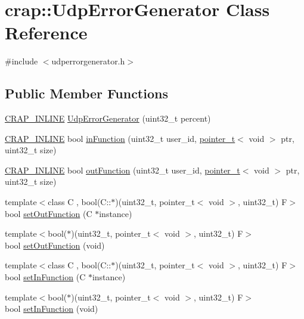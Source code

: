 \hypertarget{classcrap_1_1_udp_error_generator}{}\section{crap\+:\+:Udp\+Error\+Generator Class Reference}
\label{classcrap_1_1_udp_error_generator}


{\ttfamily \#include $<$udperrorgenerator.\+h$>$}

\subsection*{Public Member Functions}
\begin{DoxyCompactItemize}
\item 
\hyperlink{config__x86_8h_a5a40526b8d842e7ff731509998bb0f1c}{C\+R\+A\+P\+\_\+\+I\+N\+L\+I\+N\+E} \hyperlink{classcrap_1_1_udp_error_generator_aa20c6432764f4e0498decd46e19ec6c2}{Udp\+Error\+Generator} (uint32\+\_\+t percent)
\item 
\hyperlink{config__x86_8h_a5a40526b8d842e7ff731509998bb0f1c}{C\+R\+A\+P\+\_\+\+I\+N\+L\+I\+N\+E} bool \hyperlink{classcrap_1_1_udp_error_generator_ab982b08f833d37210739f819ea651188}{in\+Function} (uint32\+\_\+t user\+\_\+id, \hyperlink{structcrap_1_1pointer__t}{pointer\+\_\+t}$<$ void $>$ ptr, uint32\+\_\+t size)
\item 
\hyperlink{config__x86_8h_a5a40526b8d842e7ff731509998bb0f1c}{C\+R\+A\+P\+\_\+\+I\+N\+L\+I\+N\+E} bool \hyperlink{classcrap_1_1_udp_error_generator_aa4a2c9be7828c3b7f3d233e4cdec5be5}{out\+Function} (uint32\+\_\+t user\+\_\+id, \hyperlink{structcrap_1_1pointer__t}{pointer\+\_\+t}$<$ void $>$ ptr, uint32\+\_\+t size)
\item 
{\footnotesize template$<$class C , bool(\+C\+::$\ast$)(uint32\+\_\+t, pointer\+\_\+t$<$ void $>$, uint32\+\_\+t) F$>$ }\\bool \hyperlink{classcrap_1_1_udp_error_generator_a028f9575485e468a81e7a75ccfb7a9c1}{set\+Out\+Function} (C $\ast$instance)
\item 
{\footnotesize template$<$bool($\ast$)(uint32\+\_\+t, pointer\+\_\+t$<$ void $>$, uint32\+\_\+t) F$>$ }\\bool \hyperlink{classcrap_1_1_udp_error_generator_aecfca77218cdaecf2437c164ee3cda2d}{set\+Out\+Function} (void)
\item 
{\footnotesize template$<$class C , bool(\+C\+::$\ast$)(uint32\+\_\+t, pointer\+\_\+t$<$ void $>$, uint32\+\_\+t) F$>$ }\\bool \hyperlink{classcrap_1_1_udp_error_generator_a42efb7020c2f4f84020f4c440cbced67}{set\+In\+Function} (C $\ast$instance)
\item 
{\footnotesize template$<$bool($\ast$)(uint32\+\_\+t, pointer\+\_\+t$<$ void $>$, uint32\+\_\+t) F$>$ }\\bool \hyperlink{classcrap_1_1_udp_error_generator_a832fca94832d271598bced7199eb01a5}{set\+In\+Function} (void)
\end{DoxyCompactItemize}


